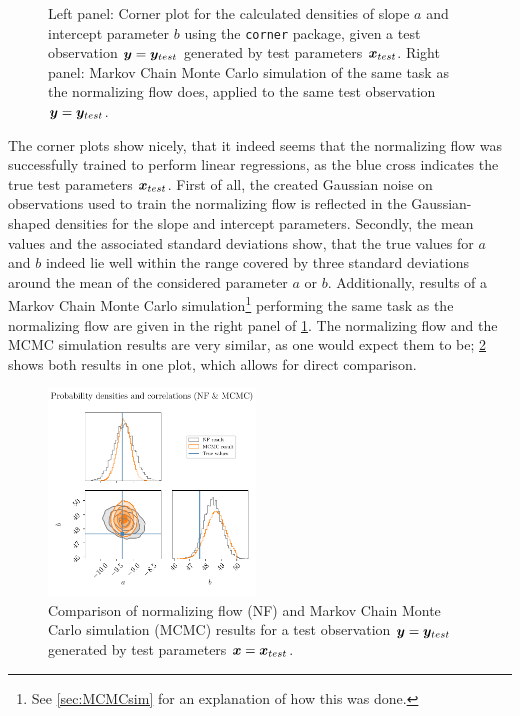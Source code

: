 \documentclass[a4paper,12pt]{report}
\begin{document}
\begin{figure}[h]
\begin{subfigure}[t]{0.49\textwidth}
	\end{subfigure}
\cprotect\caption{Left panel: Corner plot for the calculated densities of slope $a$ and intercept parameter $b$ using the \verb|corner| package, given a test observation $\bm{y} = \bm{y}_{test}$ generated by test parameters $\bm{x}_{test}$. Right panel: Markov Chain Monte Carlo simulation of the same task as the normalizing flow does, applied to the same test observation $\bm{y} = \bm{y}_{test}$.}
\label{fig:linear-regression-results}
\end{figure}
The corner plots show nicely, that it indeed seems that the normalizing flow was successfully trained to perform linear regressions, as the blue cross indicates the true test parameters $\bm{x}_{test}$. First of all, the created Gaussian noise on observations used to train the normalizing flow is reflected in the Gaussian-shaped densities for the slope and intercept parameters. Secondly, the mean values and the associated standard deviations show, that the true values for $a$ and $b$ indeed lie well within the range covered by three standard deviations around the mean of the considered parameter $a$ or $b$. Additionally, results of a Markov Chain Monte Carlo simulation\footnote{See \cref{sec:MCMCsim} for an explanation of how this was done.} performing the same task as the normalizing flow are given in the right panel of \cref{fig:linear-regression-results}. The normalizing flow and the MCMC simulation results are very similar, as one would expect them to be; \cref{fig:nf-linear-regression-example-corner-mcmc-nf} shows both results in one plot, which allows for direct comparison.
\begin{figure}[h]
\centering
\includegraphics[width=0.49\textwidth]{figures/nf-linear-regression-example-corner-mcmc-nf.pdf}
\caption{Comparison of normalizing flow (NF) and Markov Chain Monte Carlo simulation (MCMC) results for a test observation $\bm{y} = \bm{y}_{test}$ generated by test parameters $\bm{x} = \bm{x}_{test}$.}
\label{fig:nf-linear-regression-example-corner-mcmc-nf}
\end{figure}
\end{document}

